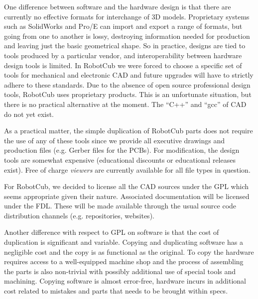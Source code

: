 One difference between software and the hardware design is that there are
currently no effective formats for interchange of 3D models.
%
Proprietary systems such as SolidWorks and Pro/E can import and export
a range of formats, but going from one to another is lossy, destroying
information needed for production and leaving just the basic geometrical
shape.
%
So in practice, designs are tied to tools produced by a particular
vendor, and interoperability
between hardware design tools is limited.
%
%
%
In RobotCub we were forced to choose a specific 
set of tools for mechanical and electronic CAD and future upgrades will have to strictly 
adhere to these standards. 
%
Due to the absence of open source professional design tools, RobotCub
uses proprietary products. 
%
This is an unfortunate situation, but there is no practical
alternative at the moment.  The ``C++'' and ``gcc'' of 
CAD do not yet exist.
%

As a practical matter, the simple duplication of RobotCub parts does not
require the use of any of these tools since we provide all executive drawings and 
production files (e.g. Gerber files for the PCBs).
%
%
%
For modification, the design tools are somewhat expensive
(educational discounts or educational releases exist).
Free of charge {\em viewers} are
currently available for all file types in question. 
%

For RobotCub, we decided to license all the CAD sources under the GPL
which seems appropriate given their nature.  Associated documentation
will be licensed under the FDL.  These will be made available through
the usual source code distribution channels (e.g. repositories,
websites).

Another difference with respect to GPL on software is that the cost
of duplication is significant and variable. Copying and duplicating 
software has a negligible cost and the copy is as functional as the 
original. To copy the hardware requires access to a well-equipped
machine shop and the process of assembling the parts is also non-trivial
with possibly additional use of special tools and machining. 
Copying software is almost error-free, hardware incurs in additional 
cost related to mistakes and parts that needs to be brought within 
specs.

